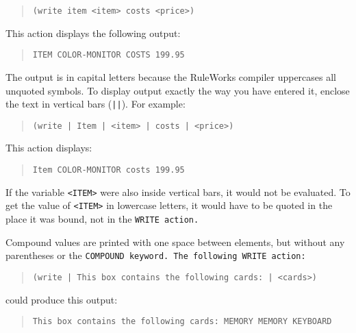 \begin{quote}
\begin{verbatim}
(write item <item> costs <price>)
\end{verbatim}
\end{quote}

This action displays the following output:

\begin{quote}
\begin{verbatim}
ITEM COLOR-MONITOR COSTS 199.95
\end{verbatim}
\end{quote}

The output is in capital letters because the RuleWorks compiler
uppercases all unquoted symbols. To display output exactly the way you
have entered it, enclose the text in vertical bars (\verb,||,). For
example:

\begin{quote}
\begin{verbatim}
(write | Item | <item> | costs | <price>)
\end{verbatim}
\end{quote}

This action displays:

\begin{quote}
\begin{verbatim}
Item COLOR-MONITOR costs 199.95
\end{verbatim}
\end{quote}

If the variable \verb|<ITEM>| were also inside vertical bars, it would
not be evaluated. To get the value of \verb|<ITEM>| in lowercase
letters, it would have to be quoted in the place it was bound, not in
the \tt{WRITE} action.

Compound values are printed with one space
between elements, but without any parentheses
or the \tt{COMPOUND} keyword. The following \tt{WRITE}
action:

\begin{quote}
\begin{verbatim}
(write | This box contains the following cards: | <cards>)
\end{verbatim}
\end{quote}

could produce this output:

\begin{quote}
\begin{verbatim}
This box contains the following cards: MEMORY MEMORY KEYBOARD
\end{verbatim}
\end{quote}

